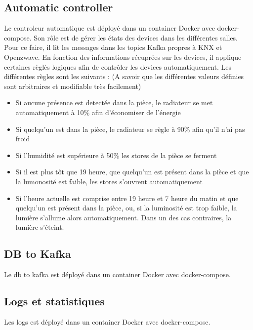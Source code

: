 \subsection{Automatic controller}
Le controleur automatique est déployé dans un container Docker avec docker-compose. Son rôle est de gérer les états des devices dans les différentes salles. Pour ce faire, il lit les messages dans les topics Kafka propres à KNX et Openzwave. En fonction des informations récuprées sur les devices, il applique certaines règlès logiques afin de contrôler les devices automatiquement.
Les différentes règles sont les suivants : (A savoir que les différentes valeurs définies sont arbitraires et modifiable très facilement)
\begin{itemize}
  \item Si aucune présence est detectée dans la pièce, le radiateur se met automatiquement à 10\% afin d'économiser de l'énergie
  \item Si quelqu'un est dans la pièce, le radiateur se règle à 90\% afin qu'il n'ai pas froid
  \item Si l'humidité est supérieure à 50\% les stores de la pièce se ferment
  \item Si il est plus tôt que 19 heure, que quelqu'un est présent dans la pièce et que la lumonosité est faible, les stores s'ouvrent automatiquement
  \item Si l'heure actuelle est comprise entre 19 heure et 7 heure du matin et que quelqu'un est présent dans la pièce, ou, si la luminosité est trop faible, la lumière s'allume alors automatiquement. Dans un des cas contraires, la lumière s'éteint.
\end{itemize}
\subsection{DB to Kafka}
Le db to kafka est déployé dans un container Docker avec docker-compose.
\subsection{Logs et statistiques}
Les logs est déployé dans un container Docker avec docker-compose.
